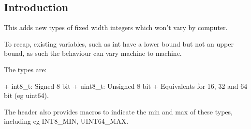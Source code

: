 
\subsection{Introduction}

This adds new types of fixed width integers which won't vary by computer.

To recap, existing variables, such as int have a lower bound but not an upper bound, as such the behaviour can vary machine to machine.

The types are:

+ int8\_t: Signed 8 bit
+ uint8\_t: Unsigned 8 bit
+ Equivalents for 16, 32 and 64 bit (eg uint64).

The header also provides macros to indicate the min and max of these types, including eg INT8\_MIN, UINT64\_MAX.
